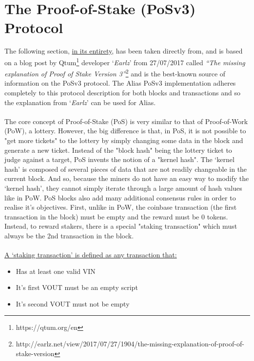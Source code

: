 \section{The Proof-of-Stake (PoSv3) Protocol}
The following section, \underline{in its entirety}, has been taken
directly from, and is based on a blog post by
Qtum\footnote{https://qtum.org/en} developer ‘\textit{Earlz}’
from 27/07/2017 called \textit{“The missing explanation of Proof
of Stake Version 3”}\footnote{http://earlz.net/view/2017/07/27/1904/the-missing-explanation-of-proof-of-stake-version}
and is the best-known source of information on the PoSv3 protocol.
The Alias PoSv3 implementation adheres completely to this protocol
description for both blocks and transactions and so the explanation from
‘\textit{Earlz}’ can be used for Alias.
\\
\\
\noindent
The core concept of Proof-of-Stake (PoS) is very similar to that of
Proof-of-Work (PoW), a lottery. However, the big difference is that,
in PoS, it is not possible to "get more tickets" to the lottery by
simply changing some data in the block and generate a new ticket.
Instead of the "block hash" being the lottery ticket to judge against
a target, PoS invents the notion of a "kernel hash". The ‘kernel hash’
is composed of several pieces of data that are not readily changeable
in the current block. And so, because the miners do not have an easy
way to modify the ‘kernel hash’, they cannot simply iterate through a
large amount of hash values like in PoW. PoS blocks also add many
additional consensus rules in order to realise it's objectives. First,
unlike in PoW, the coinbase transaction (the first transaction in the
block) must be empty and the reward must be 0 tokens. Instead, to reward
stakers, there is a special "staking transaction" which must always be
the 2nd transaction in the block.
\\
\\
\noindent
\underline{A ‘staking transaction’ is defined as
any transaction that:}


\begin{itemize}
	\item Has at least one valid VIN
	\item It's first VOUT must be an empty script
	\item It's second VOUT must not be empty
\end{itemize}

